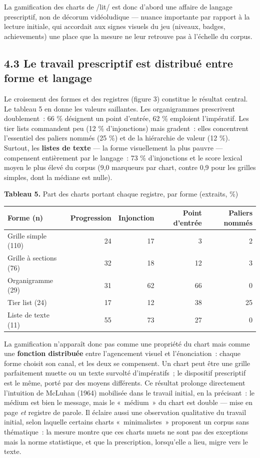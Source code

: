 \documentclass[11pt,a4paper]{article}
\begin{document}
La gamification des charts de /lit/ est donc d'abord une affaire de langage prescriptif, non de décorum vidéoludique --- nuance importante par rapport à la lecture initiale, qui accordait aux signes visuels du jeu (niveaux, badges, achievements) une place que la mesure ne leur retrouve pas à l'échelle du corpus.

\subsection*{4.3 Le travail prescriptif est distribué entre forme et langage}

Le croisement des formes et des registres (figure 3) constitue le résultat central. Le tableau 5 en donne les valeurs saillantes. Les organigrammes prescrivent doublement~: 66 \% désignent un point d'entrée, 62 \% emploient l'impératif. Les tier lists commandent peu (12 \% d'injonctions) mais gradent~: elles concentrent l'essentiel des paliers nommés (25 \%) et de la hiérarchie de valeur (12 \%). Surtout, les \textbf{listes de texte} --- la forme visuellement la plus pauvre --- compensent entièrement par le langage~: 73 \% d'injonctions et le score lexical moyen le plus élevé du corpus (9,0 marqueurs par chart, contre 0,9 pour les grilles simples, dont la médiane est nulle).

\noindent \textbf{Tableau 5.} Part des charts portant chaque registre, par forme (extraits, \%)\\[-0.2em]

\begin{center}\small
\begin{tabular}{lrrrr}
\toprule
\textbf{Forme (n)} & \textbf{Progression} & \textbf{Injonction} & \textbf{Point d'entrée} & \textbf{Paliers nommés} \\
\midrule
Grille simple (110) & 24 & 17 & 3 & 2 \\
Grille à sections (76) & 32 & 18 & 12 & 3 \\
Organigramme (29) & 31 & 62 & 66 & 0 \\
Tier list (24) & 17 & 12 & 38 & 25 \\
Liste de texte (11) & 55 & 73 & 27 & 0 \\
\bottomrule
\end{tabular}
\end{center}

La gamification n'apparaît donc pas comme une propriété du chart mais comme une \textbf{fonction distribuée} entre l'agencement visuel et l'énonciation~: chaque forme choisit son canal, et les deux se compensent. Un chart peut être une grille parfaitement muette ou un texte survolté d'impératifs~; le dispositif prescriptif est le même, porté par des moyens différents. Ce résultat prolonge directement l'intuition de McLuhan (1964) mobilisée dans le travail initial, en la précisant~: le médium est bien le message, mais le «~médium~» du chart est double --- mise en page \emph{et} registre de parole. Il éclaire aussi une observation qualitative du travail initial, selon laquelle certains charts «~minimalistes~» proposent un corpus sans thématique~: la mesure montre que ces charts muets ne sont pas des exceptions mais la norme statistique, et que la prescription, lorsqu'elle a lieu, migre vers le texte.
\end{document}
